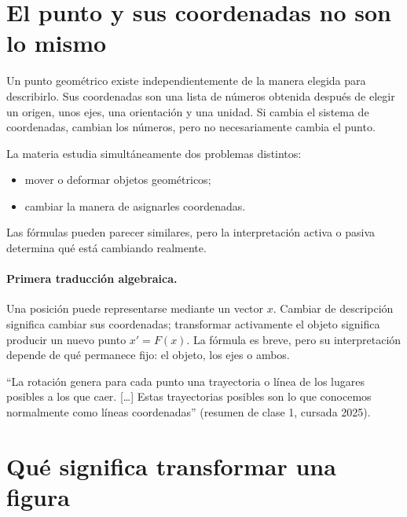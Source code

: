 \section{El punto y sus coordenadas no son lo mismo}\label{cap:04}\label{sec:punto-coordenadas}

{\small\vspace{1mm}\par}


Un punto geométrico existe independientemente de la manera elegida para describirlo. Sus
coordenadas son una lista de números obtenida después de elegir un origen, unos ejes, una
orientación y una unidad. Si cambia el sistema de coordenadas, cambian los números, pero no
necesariamente cambia el punto.

\begin{idea}
La materia estudia simultáneamente dos problemas distintos:
\begin{itemize}
  \item mover o deformar objetos geométricos;
  \item cambiar la manera de asignarles coordenadas.
\end{itemize}
Las fórmulas pueden parecer similares, pero la interpretación activa o pasiva determina qué
está cambiando realmente.
\end{idea}

\paragraph{Primera traducción algebraica.}
Una posición puede representarse mediante un vector \(x\). Cambiar de descripción significa
cambiar sus coordenadas; transformar activamente el objeto significa producir un nuevo punto
\(x'=F(x)\). La fórmula es breve, pero su interpretación depende de qué permanece fijo:
el objeto, los ejes o ambos.

\begin{idea}
``La rotación genera para cada punto una trayectoria o línea de los lugares posibles a
los que caer. [\ldots] Estas trayectorias posibles son lo que conocemos normalmente como
líneas coordenadas'' (resumen de clase 1, cursada 2025).
\end{idea}

\section{Qué significa transformar una figura}\label{sec:transformar}

